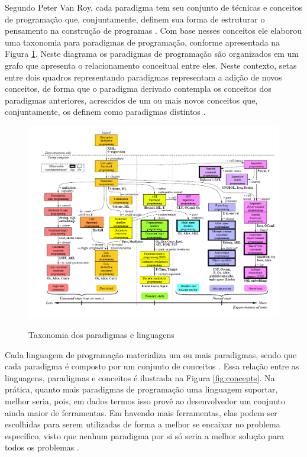 Segundo Peter Van Roy, cada paradigma tem seu conjunto de técnicas e conceitos
de programação que, conjuntamente, definem sua forma de estruturar o pensamento
na construção de programas \cite{van_roy_2012}. Com base nesses conceitos ele
elaborou uma taxonomia para paradigmas de programação, conforme apresentada na
Figura \ref{fig:paradigmas_roy}. Neste diagrama os paradigmas de programação são
organizados em um grafo que apresenta o relacionamento conceitual entre eles.
Neste contexto, setas entre dois quadros representando paradigmas representam a
adição de novos conceitos, de forma que o paradigma derivado contempla os
conceitos dos paradigmas anteriores, acrescidos de um ou mais novos conceitos
que, conjuntamente, os definem como paradigmas distintos \cite{van_roy_2012}.

\begin{figure}[!htb]
  \centering
  \caption{Taxonomia dos paradigmas e linguagens}
  \includegraphics[width=\textwidth, height=0.46\textheight]{../figures/taxonomia.png}
  \label{fig:paradigmas_roy}
\end{figure}

Cada linguagem de programação materializa um ou mais paradigmas, sendo que cada
paradigma é composto por um conjunto de conceitos \cite{van_roy_2012}. Essa
relação entre as linguagens, paradigmas e conceitos é ilustrada na Figura
\ref{fig:concepts}. Na prática, quanto mais paradigmas de programação uma
linguagem suportar, melhor seria, pois, em dados termos isso provê ao
desenvolvedor um conjunto ainda maior de ferramentas. Em havendo mais
ferramentas, elas podem ser escolhidas para serem utilizadas de forma a melhor
se encaixar no problema específico, visto que nenhum paradigma por si só seria a
melhor solução para todos os problemas \cite{van_roy_2004}.

